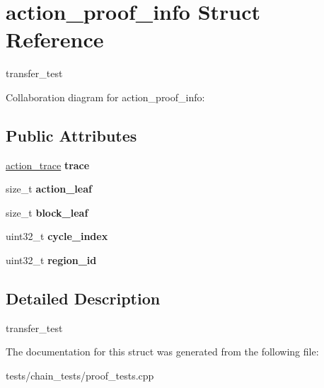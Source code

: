 \hypertarget{structaction__proof__info}{}\section{action\+\_\+proof\+\_\+info Struct Reference}
\label{structaction__proof__info}


transfer\+\_\+test  




Collaboration diagram for action\+\_\+proof\+\_\+info\+:
\subsection*{Public Attributes}
\begin{DoxyCompactItemize}
\item 
\mbox{\label{structaction__proof__info_ae7f86c4b626c0580e3d1d7f3dfd33fde}} 
\mbox{\hyperlink{structaacio_1_1chain_1_1action__trace}{action\+\_\+trace}} {\bfseries trace}
\item 
\mbox{\label{structaction__proof__info_a49e0e447d4174a60796055d55a562a2d}} 
size\+\_\+t {\bfseries action\+\_\+leaf}
\item 
\mbox{\label{structaction__proof__info_ab2527b22537b438bafeb2b351305e239}} 
size\+\_\+t {\bfseries block\+\_\+leaf}
\item 
\mbox{\label{structaction__proof__info_aa9f1359c0cd3a30bb8cedb657c6f70ab}} 
uint32\+\_\+t {\bfseries cycle\+\_\+index}
\item 
\mbox{\label{structaction__proof__info_aaf6157a672158e1165183a8c21493903}} 
uint32\+\_\+t {\bfseries region\+\_\+id}
\end{DoxyCompactItemize}


\subsection{Detailed Description}
transfer\+\_\+test 

The documentation for this struct was generated from the following file\+:\begin{DoxyCompactItemize}
\item 
tests/chain\+\_\+tests/proof\+\_\+tests.\+cpp\end{DoxyCompactItemize}

